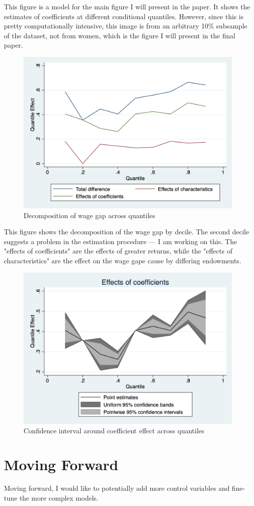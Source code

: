 \documentclass[12pt]{article}
\begin{document}
This figure is a model for the main figure I will present in the paper. It shows the estimates of coefficients at different conditional quantiles. However, since this is pretty computationally intensive, this image is from an arbitrary 10\% subsample of the dataset, not from women, which is the figure I will present in the final paper.

\begin{figure}
	\centering
	\includegraphics[width=.6\textwidth]{../../paper/figures/mm-decomp.png}
	\caption{Decomposition of wage gap across quantiles}
\end{figure}	

This figure shows the decomposition of the wage gap by decile. The second decile suggests a problem in the estimation procedure --- I am working on this. The "effects of coefficients" are the effects of greater returns, while the "effects of characteristics" are the effect on the wage gape cause by differing endowments.

\begin{figure}
	\centering
	\includegraphics[width=.6\textwidth]{../../paper/figures/mm-coef-effects.png}
	\caption{Confidence interval around coefficient effect across quantiles}
\end{figure}	

\section{Moving Forward}

Moving forward, I would like to potentially add more control variables and fine-tune the more complex models.
\end{document}
